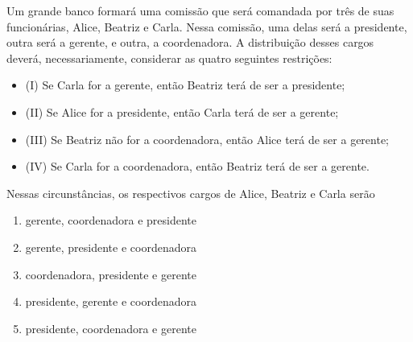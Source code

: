\item
		 Um grande banco formará uma comissão que será comandada por três de suas funcionárias, Alice, Beatriz e Carla. Nessa comissão, uma delas será a presidente, outra será a gerente, e outra, a coordenadora. A distribuição desses cargos deverá, necessariamente, considerar as quatro seguintes restrições:
		 \begin{itemize}
				 \item (I) Se Carla for a gerente, então Beatriz terá de ser a presidente;
				 \item (II) Se Alice for a presidente, então Carla terá de ser a gerente;
				 \item (III) Se Beatriz não for a coordenadora, então Alice terá de ser a gerente;
				 \item (IV) Se Carla for a coordenadora, então Beatriz terá de ser a gerente.
		 \end{itemize}

Nessas circunstâncias, os respectivos cargos de Alice, Beatriz e Carla serão
\begin{enumerate}
		\item gerente, coordenadora e presidente 
		\item gerente, presidente e coordenadora
		\item coordenadora, presidente e gerente
		\item presidente, gerente e coordenadora
		\item presidente, coordenadora e gerente
\end{enumerate}

